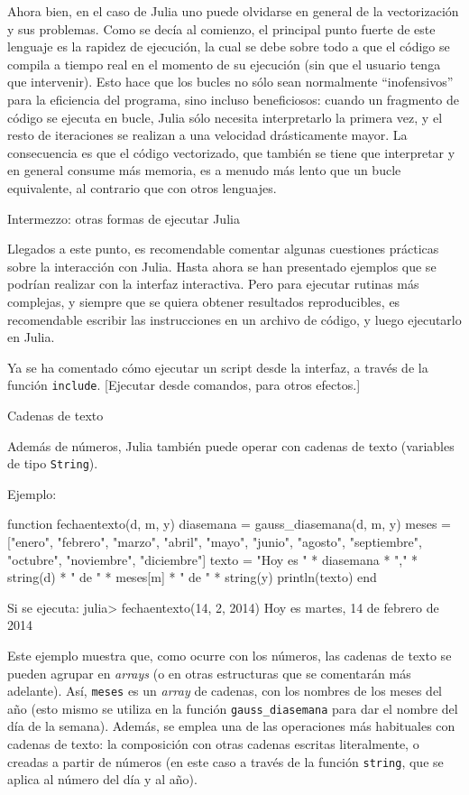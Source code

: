 ﻿\documentclass[spanish]{article}
\begin{document}
Ahora bien, en el caso de Julia uno puede olvidarse en general
de la vectorización y sus problemas. Como se decía al comienzo, el principal punto
fuerte de este lenguaje es la rapidez de ejecución, la cual se debe
sobre todo a que el código se compila a tiempo real en el momento de
su ejecución (sin que el usuario tenga que intervenir). Esto hace
que los bucles no sólo sean normalmente ``inofensivos'' para la
eficiencia del programa, sino incluso beneficiosos: cuando un
fragmento de código se ejecuta en bucle, Julia sólo necesita
interpretarlo la primera vez, y el resto de iteraciones se realizan
a una velocidad drásticamente mayor. La consecuencia es que
el código vectorizado, que también se tiene que interpretar y
en general consume más memoria, es a menudo más lento que un bucle
equivalente, al contrario que con otros lenguajes.


Intermezzo: otras formas de ejecutar Julia

Llegados a este punto, es recomendable comentar algunas cuestiones prácticas
sobre la interacción con Julia. Hasta ahora se han presentado ejemplos
que se podrían realizar con la interfaz interactiva. Pero para ejecutar
rutinas más complejas, y siempre que
se quiera obtener resultados reproducibles, es recomendable escribir
las instrucciones en un archivo de código, y luego ejecutarlo en Julia.

Ya se ha comentado cómo ejecutar un script desde la interfaz, a través de
la función \texttt{include}. [Ejecutar desde comandos, para otros efectos.]


Cadenas de texto


Además de números, Julia también puede operar con cadenas de texto
(variables de tipo \texttt{String}). 

Ejemplo:

function fechaentexto(d, m, y)
  diasemana = gauss_diasemana(d, m, y)
  meses = ["enero", "febrero", "marzo", "abril", "mayo", "junio",
    "agosto", "septiembre", "octubre", "noviembre", "diciembre"]
  texto = "Hoy es " * diasemana * "," * 
    string(d) * " de " * meses[m] * " de " * string(y)
  println(texto)
end

Si se ejecuta:
julia> fechaentexto(14, 2, 2014)
Hoy es martes, 14 de febrero de 2014

Este ejemplo muestra que, como ocurre con los números, las cadenas de texto
se pueden agrupar en \emph{arrays} (o en otras estructuras que se comentarán
más adelante). Así, \texttt{meses} es un \emph{array} de cadenas, con los
nombres de los meses del año (esto mismo se utiliza en la función
\texttt{gauss_diasemana} para dar el nombre del día de la semana). Además,
se emplea una de las operaciones más habituales con cadenas de texto:
la composición con otras cadenas escritas literalmente, o creadas a partir de
números (en este caso a través de la función \texttt{string}, que se aplica
al número del día y al año).
\end{document}
